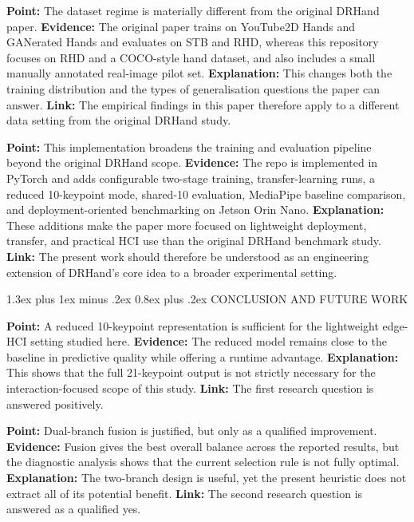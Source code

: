 \documentclass[10pt,letterpaper]{article}
\makeatletter
\renewcommand\section{\@startsection{section}{1}{\z@}%
  {1.3ex plus 1ex minus .2ex}%
  {0.8ex plus .2ex}%
  {\centering\normalfont\small\scshape}}
\makeatother
\begin{document}
\medskip
\noindent\textbf{Point:} The dataset regime is materially different from the original DRHand paper.
\textbf{Evidence:} The original paper trains on YouTube2D Hands and GANerated Hands and evaluates on STB and RHD, whereas this repository focuses on RHD and a COCO-style hand dataset, and also includes a small manually annotated real-image pilot set.
\textbf{Explanation:} This changes both the training distribution and the types of generalisation questions the paper can answer.
\textbf{Link:} The empirical findings in this paper therefore apply to a different data setting from the original DRHand study.

\medskip
\noindent\textbf{Point:} This implementation broadens the training and evaluation pipeline beyond the original DRHand scope.
\textbf{Evidence:} The repo is implemented in PyTorch and adds configurable two-stage training, transfer-learning runs, a reduced 10-keypoint mode, shared-10 evaluation, MediaPipe baseline comparison, and deployment-oriented benchmarking on Jetson Orin Nano.
\textbf{Explanation:} These additions make the paper more focused on lightweight deployment, transfer, and practical HCI use than the original DRHand benchmark study.
\textbf{Link:} The present work should therefore be understood as an engineering extension of DRHand's core idea to a broader experimental setting.

\section{CONCLUSION AND FUTURE WORK}

\noindent\textbf{Point:} A reduced 10-keypoint representation is sufficient for the lightweight edge-HCI setting studied here.
\textbf{Evidence:} The reduced model remains close to the baseline in predictive quality while offering a runtime advantage.
\textbf{Explanation:} This shows that the full 21-keypoint output is not strictly necessary for the interaction-focused scope of this study.
\textbf{Link:} The first research question is answered positively.

\medskip
\noindent\textbf{Point:} Dual-branch fusion is justified, but only as a qualified improvement.
\textbf{Evidence:} Fusion gives the best overall balance across the reported results, but the diagnostic analysis shows that the current selection rule is not fully optimal.
\textbf{Explanation:} The two-branch design is useful, yet the present heuristic does not extract all of its potential benefit.
\textbf{Link:} The second research question is answered as a qualified yes.
\end{document}
